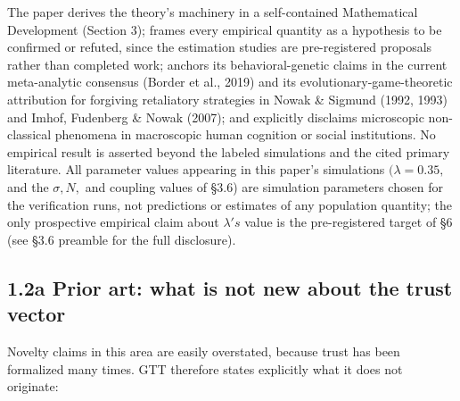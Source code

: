 \documentclass[
]{article}
\begin{document}
The paper derives the theory's machinery in a self-contained
Mathematical Development (Section 3); frames every empirical quantity as
a hypothesis to be confirmed or refuted, since the estimation studies
are pre-registered proposals rather than completed work; anchors its
behavioral-genetic claims in the current meta-analytic consensus (Border
et al., 2019) and its evolutionary-game-theoretic attribution for
forgiving retaliatory strategies in Nowak \& Sigmund (1992, 1993) and
Imhof, Fudenberg \& Nowak (2007); and explicitly disclaims microscopic
non-classical phenomena in macroscopic human cognition or social
institutions. No empirical result is asserted beyond the labeled
simulations and the cited primary literature. All parameter values
appearing in this paper's simulations \((\lambda = 0.35,\) and the
\(\sigma, N,\) and coupling values of §3.6) are simulation parameters
chosen for the verification runs, not predictions or estimates of any
population quantity; the only prospective empirical claim about
\(\lambda's\) value is the pre-registered target of §6 (see §3.6
preamble for the full disclosure).

\subsection{1.2a Prior art: what is not new about the trust
vector}\label{a-prior-art-what-is-not-new-about-the-trust-vector}

Novelty claims in this area are easily overstated, because trust has
been formalized many times. GTT therefore states explicitly what it does
not originate:
\end{document}
